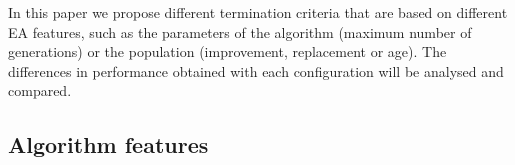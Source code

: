 \documentclass[runningheads,a4paper]{llncs}
\begin{document}
In this paper we propose different termination criteria that are based on different EA features, such as the parameters of the algorithm (maximum number of generations) or the population (improvement, replacement or age). 
The differences in performance obtained with each configuration will be analysed and compared. 


\subsection{Algorithm features}

 

\end{document}
